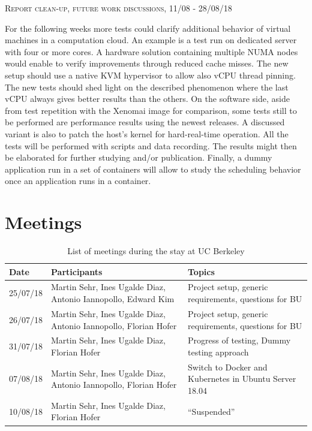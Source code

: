 \documentclass[]{scrartcl}
\begin{document}
{\small\textsc{Report clean-up, future work discussions, 11/08 - 28/08/18} \bigskip}

For the following weeks more tests could clarify additional behavior of virtual machines in a computation cloud. An example is a test run on dedicated server with four or more cores. A hardware solution containing multiple NUMA nodes would enable to verify improvements through reduced cache misses.
The new setup should use a native KVM hypervisor to allow also vCPU thread pinning. The new tests should shed light on the described phenomenon where the last vCPU always gives better results than the others.
On the software side, aside from test repetition with the Xenomai image for comparison, some tests still to be performed are performance results using the newest releases. A discussed variant is also to patch the host's kernel for hard-real-time operation.
All the tests will be performed with scripts and data recording. The results might then be elaborated for further studying and/or publication.
Finally, a dummy application run in a set of containers will allow to study the scheduling behavior once an application runs in a container.

\section{Meetings}
\label{sec:meeting}

\begin{table}[H]
	\centering
	\caption{List of meetings during the stay at UC Berkeley}
	
	\begin{tabular}{l p{5cm} p{5cm}}
	Date & Participants & Topics \\
	\hline
	25/07/18 & Martin Sehr, Ines Ugalde Diaz, Antonio Iannopollo, Edward Kim & Project setup, generic requirements, questions for BU\\
	26/07/18 & Martin Sehr, Ines Ugalde Diaz, Antonio Iannopollo, Florian Hofer & Project setup, generic requirements, questions for BU\\
	31/07/18 & Martin Sehr, Ines Ugalde Diaz, Florian Hofer & Progress of testing, Dummy testing approach\\
	07/08/18 & Martin Sehr, Ines Ugalde Diaz, Antonio Iannopollo, Florian Hofer & Switch to Docker and Kubernetes in Ubuntu Server 18.04\\
	10/08/18 & Martin Sehr, Ines Ugalde Diaz, Florian Hofer & ``Suspended''\\
	\hline
	\end{tabular}
	
	\label{tab:meeting}
\end{table}



\end{document}
